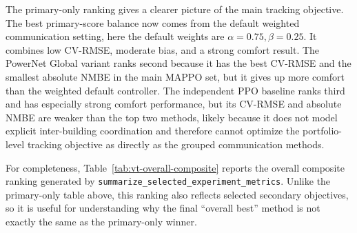 The primary-only ranking gives a clearer picture of the main tracking objective.
The best primary-score balance now comes from the default weighted
communication setting, here the default weights are
\mbox{$\alpha=0.75,\beta=0.25$}. It combines low CV-RMSE, moderate bias, and a
strong comfort result. The PowerNet Global variant ranks second because it has the best
CV-RMSE and the smallest absolute NMBE in the main MAPPO set, but it gives up
more comfort than the weighted default controller. The independent PPO baseline
ranks third and has especially strong comfort performance, but its CV-RMSE and
absolute NMBE are weaker than the top two methods, likely because it does not
model explicit inter-building coordination and therefore cannot optimize the
portfolio-level tracking objective as directly as the grouped communication
methods.

For completeness, Table~\ref{tab:vt-overall-composite} reports the overall
composite ranking generated by
\nolinkurl{summarize_selected_experiment_metrics}. Unlike the primary-only
table above, this ranking also reflects selected secondary objectives, so it is
useful for understanding why the final ``overall best'' method is not exactly
the same as the primary-only winner.

